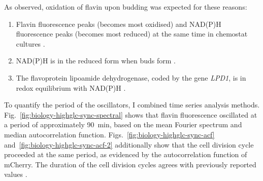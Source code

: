 As observed, oxidation of flavin upon budding was expected for these reasons:
\begin{enumerate}
  \item Flavin fluorescence peaks (becomes most oxidised) and NAD(P)H fluorescence peaks (becomes most reduced) at the same time in chemostat cultures \parencite{murrayRedoxRegulationRespiring2011}.
  \item NAD(P)H is in the reduced form when buds form \parencite{papagiannakisAutonomousMetabolicOscillations2017}.
  \item The flavoprotein lipoamide dehydrogenase, coded by the gene \textit{LPD1}, is in redox equilibrium with NAD(P)H \parencite{sianoNADHFlavinFluorescence1989}.
\end{enumerate}

To quantify the period of the oscillators, I combined time series analysis methods.
Fig.\ \ref{fig:biology-highglc-sync-spectral} shows that flavin fluorescence oscillated at a period of approximately \SI{90}{\minute}, based on the mean Fourier spectrum and median autocorrelation function.
Figs.\ \ref{fig:biology-highglc-sync-acf} and~\ref{fig:biology-highglc-sync-acf-2} additionally show that the cell division cycle proceeded at the same period, as evidenced by the autocorrelation function of mCherry.
The duration of the cell division cycles agrees with previously reported values \parencite{herskowitzLifeCycleBudding1988}.


